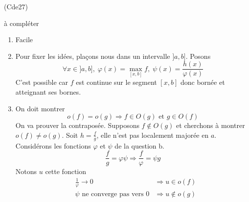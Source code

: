 \begin{tiny}(Cde27)\end{tiny} à compléter
\begin{enumerate}
  \item Facile
  \item Pour fixer les idées, plaçons nous dans un intervalle $]a,b]$. Posons
\begin{displaymath}
\forall x\in ]a,b],\;  \varphi(x) = \max_{[x,b]}f,\; \psi(x) = \frac{h(x)}{\varphi(x)}
\end{displaymath}
C'est possible car $f$ est continue sur le segment $[x,b]$ donc bornée et atteignant ses bornes.
  \item On doit montrer 
\begin{displaymath}
  o(f) = o(g) \Rightarrow f\in O(g) \text{ et } g\in O(f)
\end{displaymath}
On va prouver la contraposée. Supposons $f\notin O(g)$ et cherchons à montrer $o(f)\neq o(g)$. Soit $h= \frac{f}{g}$, elle n'est pas localement majorée en $a$. Considérons les fonctions $\varphi$ et $\psi$ de la question b.
\begin{displaymath}
\frac{f}{g} = \varphi \psi  \Rightarrow \frac{f}{\varphi} =  \psi g
\end{displaymath}
Notons $u$ cette fonction
\begin{align*}
  &\frac{1}{\varphi}\rightarrow 0 &\Rightarrow u \in o(f) \\
  &\psi \text{ ne converge pas vers $0$} &\Rightarrow u \notin o(g) 
\end{align*}
\end{enumerate}
